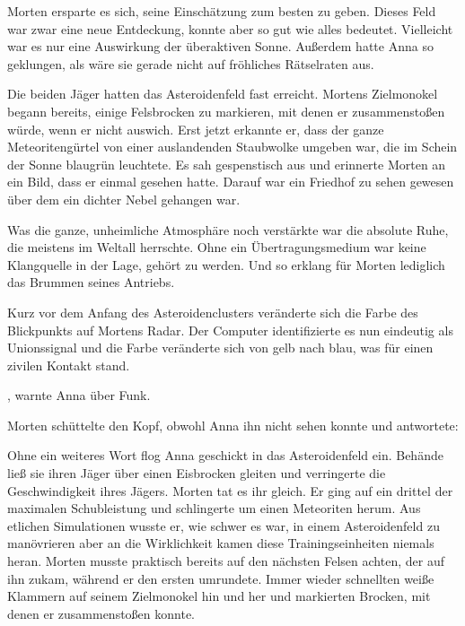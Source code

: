 \par

Morten ersparte es sich, seine Einschätzung zum besten zu geben. Dieses Feld war zwar eine neue Entdeckung, konnte aber so gut wie alles bedeutet. Vielleicht war es nur eine Auswirkung der überaktiven Sonne. Außerdem hatte Anna so geklungen, als wäre sie gerade nicht auf fröhliches Rätselraten aus.

\par

Die beiden Jäger hatten das Asteroidenfeld fast erreicht. Mortens Zielmonokel begann bereits, einige Felsbrocken zu markieren, mit denen er zusammenstoßen würde, wenn er nicht auswich. Erst jetzt erkannte er, dass der ganze Meteoritengürtel von einer auslandenden Staubwolke umgeben war, die im Schein der Sonne blaugrün leuchtete. Es sah gespenstisch aus und erinnerte Morten an ein Bild, dass er einmal gesehen hatte. Darauf war ein Friedhof zu sehen gewesen über dem ein dichter Nebel gehangen war.

\par

Was die ganze, unheimliche Atmosphäre noch verstärkte war die absolute Ruhe, die meistens im Weltall herrschte. Ohne ein Übertragungsmedium war keine Klangquelle in der Lage, gehört zu werden. Und so erklang für Morten lediglich das Brummen seines Antriebs.

\par

Kurz vor dem Anfang des Asteroidenclusters veränderte sich die Farbe des Blickpunkts auf Mortens Radar. Der Computer identifizierte es nun eindeutig als Unionssignal und die Farbe veränderte sich von gelb nach blau, was für einen zivilen Kontakt stand.

\par

, warnte Anna über Funk.

\par

Morten schüttelte den Kopf, obwohl Anna ihn nicht sehen konnte und antwortete: 

\par

Ohne ein weiteres Wort flog Anna geschickt in das Asteroidenfeld ein. Behände ließ sie ihren Jäger über einen Eisbrocken gleiten und verringerte die Geschwindigkeit ihres Jägers. Morten tat es ihr gleich. Er ging auf ein drittel der maximalen Schubleistung und schlingerte um einen Meteoriten herum. Aus etlichen Simulationen wusste er, wie schwer es war, in einem Asteroidenfeld zu manövrieren aber an die Wirklichkeit kamen diese Trainingseinheiten niemals heran. Morten musste praktisch bereits auf den nächsten Felsen achten, der auf ihn zukam, während er den ersten umrundete. Immer wieder schnellten weiße Klammern auf seinem Zielmonokel hin und her und markierten Brocken, mit denen er zusammenstoßen konnte.

